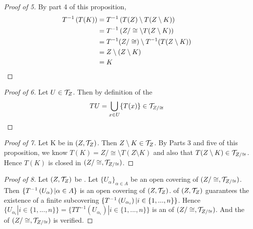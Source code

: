 \begin{prop}
\begin{proof}[Proof of 5]
        By part 4 of this proposition, 
        \begin{align*}
            T^{-1}\left( T(K)\right)&=T^{-1} \left( T(Z) \setminus T(Z \setminus K)\right) \\
            &= T^{-1}\left( Z/\cong \setminus T(Z \setminus K)\right)\\
            &=T^{-1}(Z/\cong) \setminus T^{-1}(T(Z\setminus K)) \\
            &= Z \setminus \left( Z \setminus K\right) \\
            &= K
        \end{align*}      
    \end{proof}
    \begin{proof}[Proof of 6]
        Let $U \in \mathcal{T}_Z$.
        Then by definition of the \QuotientSpaceTopology
        \begin{equation}
            TU= \bigcup_{x \in U} \{T(x)\}  \in \mathcal{T}_{Z/\cong}
        \end{equation}
    \end{proof}  
    \begin{proof}[Proof of 7] 
        Let K be \SetClosed in $(Z,\mathcal{T}_Z)$. 
        Then $Z \setminus K \in \mathcal{T}_Z$. 
        By Parts 3 and five of this proposition, we know $T(K) = Z/\cong \setminus T(Z\setminus K)$ and also that $T(Z\setminus K) \in \mathcal{T}_{Z/\cong}$. Hence $T(K)$ is closed in $(Z/\cong, \mathcal{T}_{Z/\cong})$. 
    \end{proof} 
    \begin{proof}[Proof of 8]
        Let $(Z,\mathcal{T}_Z)$ be \SetCompact. 
        Let $\{U_{\alpha}\}_{\alpha \in A}$ be an open covering of $(Z/\cong, \mathcal{T}_{Z/\cong})$. 
        Then $\{T^{-1}\left( U_{\alpha}\right) | \alpha \in A\}$ is an open covering of $(Z, \mathcal{T}_Z)$. 
        \SetCompactness of $(Z, \mathcal{T}_Z)$ guarantees the existence of a finite subcovering $\{T^{-1}\left( U_{\alpha_i}\right) | i \in \{1, ..., n\}\}$. 
        Hence
        $\{U_{\alpha_i} | i \in \{1, ..., n\}\}=\{TT^{-1}(U_{\alpha_i}) | i \in \{1, ..., n\}\}$ is an 
		\OpenCover of $(Z/\cong, \mathcal{T}_{Z/\cong})$. 
         And the \SetCompactness of $(Z/\cong, \mathcal{T}_{Z/\cong})$ is verified. 
         

\end{proof}
\end{prop}
